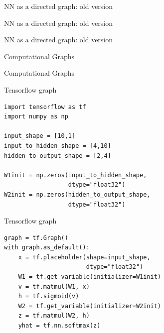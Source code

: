 \documentclass[10pt]{beamer}
\begin{document}
\begin{frame}[fragile]{NN as a directed graph: old version}

\end{frame}

\begin{frame}[fragile]{NN as a directed graph: old version}

\end{frame}

\begin{frame}[fragile]{NN as a directed graph: old version}
\begin{center}

\end{center}
\end{frame}

\begin{frame}[fragile]{Computational Graphs}

\end{frame}

\begin{frame}[fragile]{Computational Graphs}

\end{frame}



\begin{frame}[fragile]{Tensorflow graph}
\begin{verbatim}
import tensorflow as tf
import numpy as np

input_shape = [10,1]
input_to_hidden_shape = [4,10]
hidden_to_output_shape = [2,4]

W1init = np.zeros(input_to_hidden_shape,
				  dtype="float32")
W2init = np.zeros(hidden_to_output_shape,
				  dtype="float32")
\end{verbatim}
\end{frame}


\begin{frame}[fragile]{Tensorflow graph}
\begin{verbatim}
graph = tf.Graph() 
with graph.as_default():
    x = tf.placeholder(shape=input_shape,
                       dtype="float32") 
    W1 = tf.get_variable(initializer=W1init)
    v = tf.matmul(W1, x)
    h = tf.sigmoid(v)
    W2 = tf.get_variable(initializer=W2init)
    z = tf.matmul(W2, h)
    yhat = tf.nn.softmax(z)
\end{verbatim}
\end{frame}
\end{document}
